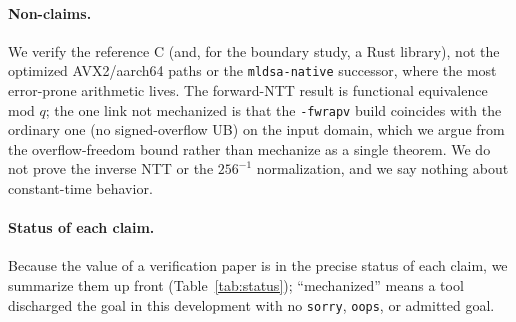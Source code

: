 \documentclass[journal=tches,submission,review]{iacrtrans}
\newcommand{\code}[1]{\texttt{#1}}
\begin{document}
\paragraph{Non-claims.} We verify the reference C (and, for the boundary study, a Rust library), not the
optimized AVX2/aarch64 paths or the \code{mldsa-native} successor, where the most error-prone arithmetic
lives. The forward-NTT result is functional equivalence mod $q$; the one link not mechanized is that the
\code{-fwrapv} build coincides with the ordinary one (no signed-overflow UB) on the input domain, which
we argue from the overflow-freedom bound rather than mechanize as a single theorem. We do not prove the
inverse NTT or the $256^{-1}$ normalization, and we say nothing about constant-time behavior.

\paragraph{Status of each claim.} Because the value of a verification paper is in the precise status of
each claim, we summarize them up front (Table~\ref{tab:status}); ``mechanized'' means a tool discharged
the goal in this development with no \code{sorry}, \code{oops}, or admitted goal.
\end{document}
